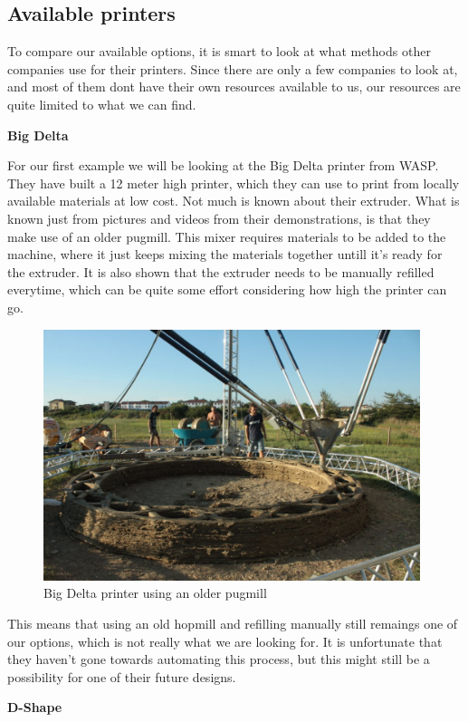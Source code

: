 \documentclass[12pt, a4paper]{article}
\begin{document}
\subsection{Available printers}
To compare our available options, it is smart to look at what methods other companies use for their printers. Since there are only a few companies to look at, and most of them dont have their own resources available to us, our resources are quite limited to what we can find.

\textbf{Big Delta}

For our first example we will be looking at the Big Delta printer from WASP. They have built a 12 meter high printer, which they can use to print from locally available materials at low cost. Not much is known about their extruder. What is known just from pictures and videos from their demonstrations, is that they make use of an older pugmill. This mixer requires materials to be added to the machine, where it just keeps mixing the materials together untill it's ready for the extruder. It is also shown that the extruder needs to be manually refilled everytime, which can be quite some effort considering how high the printer can go.
\begin{figure}[H]
	\centering
	\includegraphics[width=11cm, keepaspectratio]{bigdelta}
	\caption{Big Delta printer using an older pugmill}
\end{figure}

This means that using an old hopmill and refilling manually still remaings one of our options, which is not really what we are looking for. It is unfortunate that they haven't gone towards automating this process, but this might still be a possibility for one of their future designs.
	\newpage
	
\textbf{D-Shape}
	
\end{document}
